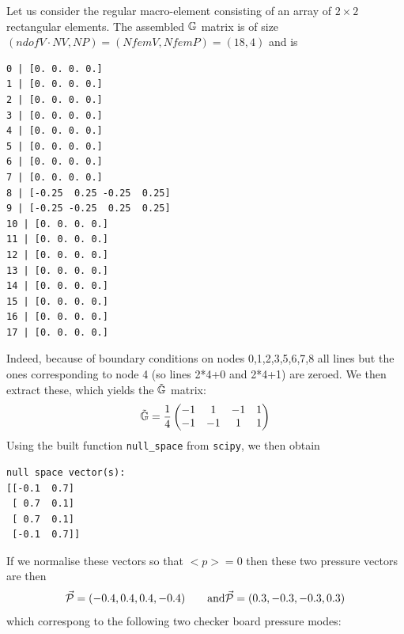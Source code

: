 \begin{center}
\end{center}

Let us consider the regular macro-element consisting of an array of $2\times 2$ rectangular elements. 
The assembled ${\mathbb{G}}$ matrix is of size $(ndofV \cdot NV, NP)=(NfemV,NfemP)=(18,4)$ and is 
{\small
\begin{verbatim}
0 | [0. 0. 0. 0.]
1 | [0. 0. 0. 0.]
2 | [0. 0. 0. 0.]
3 | [0. 0. 0. 0.]
4 | [0. 0. 0. 0.]
5 | [0. 0. 0. 0.]
6 | [0. 0. 0. 0.]
7 | [0. 0. 0. 0.]
8 | [-0.25  0.25 -0.25  0.25]
9 | [-0.25 -0.25  0.25  0.25]
10 | [0. 0. 0. 0.]
11 | [0. 0. 0. 0.]
12 | [0. 0. 0. 0.]
13 | [0. 0. 0. 0.]
14 | [0. 0. 0. 0.]
15 | [0. 0. 0. 0.]
16 | [0. 0. 0. 0.]
17 | [0. 0. 0. 0.]
\end{verbatim}
}
Indeed, because of boundary conditions on nodes 0,1,2,3,5,6,7,8 all lines 
but the ones corresponding to node 4 (so lines 2*4+0 and 2*4+1) are zeroed. 
We then extract these, which yields the $\tilde{{\mathbb{G}}}$ matrix:
\[
\tilde{{\mathbb{G}}}=
\frac14
\begin{pmatrix}
-1 &1 &-1 &1 \\
-1 &-1& 1 &1
\end{pmatrix}
\]
Using the built function \lstinline{null_space} from \lstinline{scipy}, 
we then obtain 
\begin{verbatim}
null space vector(s):
[[-0.1  0.7]
 [ 0.7  0.1]
 [ 0.7  0.1]
 [-0.1  0.7]]
\end{verbatim}
If we normalise these vectors so that $<p>=0$ then these two 
pressure vectors are then
\[
\vec{\cal P}=(-0.4,0.4,0.4,-0.4)
\qquad \text{and}
\vec{\cal P}=(0.3,-0.3,-0.3,0.3)
\]
which correspong to the following two checker board pressure modes:

